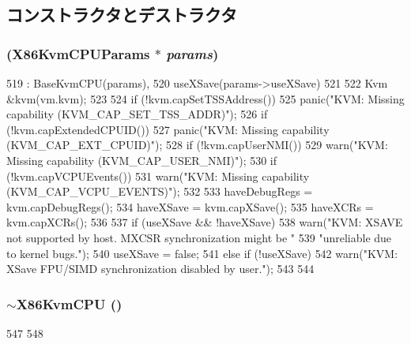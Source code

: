 \subsection{コンストラクタとデストラクタ}
\hypertarget{classX86KvmCPU_a775cadafe573db795406b498b53cff43}{
\subsubsection[{X86KvmCPU}]{ (X86KvmCPUParams $\ast$ {\em params})}}
\label{classX86KvmCPU_a775cadafe573db795406b498b53cff43}



\begin{DoxyCode}
519     : BaseKvmCPU(params),
520       useXSave(params->useXSave)
521 {
522     Kvm &kvm(vm.kvm);
523 
524     if (!kvm.capSetTSSAddress())
525         panic("KVM: Missing capability (KVM_CAP_SET_TSS_ADDR)\n");
526     if (!kvm.capExtendedCPUID())
527         panic("KVM: Missing capability (KVM_CAP_EXT_CPUID)\n");
528     if (!kvm.capUserNMI())
529         warn("KVM: Missing capability (KVM_CAP_USER_NMI)\n");
530     if (!kvm.capVCPUEvents())
531         warn("KVM: Missing capability (KVM_CAP_VCPU_EVENTS)\n");
532 
533     haveDebugRegs = kvm.capDebugRegs();
534     haveXSave = kvm.capXSave();
535     haveXCRs = kvm.capXCRs();
536 
537     if (useXSave && !haveXSave) {
538         warn("KVM: XSAVE not supported by host. MXCSR synchronization might be "
539              "unreliable due to kernel bugs.\n");
540         useXSave = false;
541     } else if (!useXSave) {
542         warn("KVM: XSave FPU/SIMD synchronization disabled by user.\n");
543     }
544 }
\end{DoxyCode}
\hypertarget{classX86KvmCPU_ad55c9b8bef2361530e30e7f3eb1a58c1}{
\subsubsection[{$\sim$X86KvmCPU}]{\setlength{\rightskip}{0pt plus 5cm}$\sim${\bf X86KvmCPU} ()}}
\label{classX86KvmCPU_ad55c9b8bef2361530e30e7f3eb1a58c1}



\begin{DoxyCode}
547 {
548 }
\end{DoxyCode}


